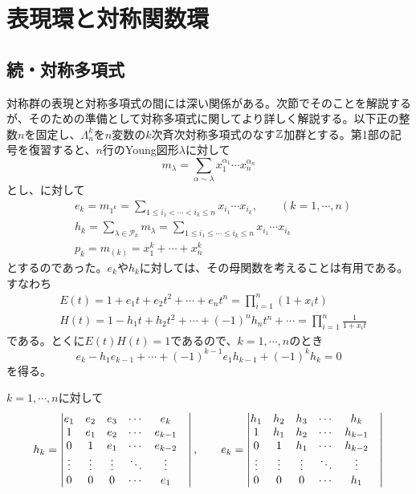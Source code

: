 \documentclass{ltjsreport}
\begin{document}
\section{表現環と対称関数環}

\subsection{続・対称多項式}
対称群の表現と対称多項式の間には深い関係がある。次節でそのことを解説するが、そのための準備として対称多項式に関してより詳しく解説する。以下正の整数$n$を固定し、$\Lambda^k_n$を$n$変数の$k$次斉次対称多項式のなす$\mathbb{Z}$加群とする。第1部の記号を復習すると、$n$行のYoung図形$\lambda$に対して
\[
m_\lambda=\sum_{\alpha\sim\lambda}x_1^{\alpha_1}\cdots x_n^{\alpha_n}  
\]
とし、に対して
\begin{align*}
  &e_k=m_{1^k}=\sum_{1\leq i_1<\cdots<i_k\leq n}x_{i_1}\cdots x_{i_k},\qquad(k=1,\cdots,n)\\
  &h_k=\sum_{\lambda\in\mathcal{P}_k}m_\lambda=\sum_{1\leq i_1\leq\cdots\leq i_k\leq n}x_{i_1}\cdots x_{i_k}\\
  &p_k=m_{(k)}=x_1^k+\cdots+x_n^k
\end{align*}
とするのであった。$e_k$や$h_k$に対しては、その母関数を考えることは有用である。すなわち
\begin{align}
  &E(t)=1+e_1t+e_2t^2+\cdots+e_nt^n=\prod_{i=1}^n(1+x_it) \label{gen_func_of_e}\\
  &H(t)=1-h_1t+h_2t^2+\cdots+(-1)^nh_nt^n+\cdots=\prod_{i=1}^n\frac{1}{1+x_it}
\end{align}
である。とくに$E(t)H(t)=1$であるので、$k=1,\cdots,n$のとき
\begin{equation}\label{e_to_h}
  e_k-h_1e_{k-1}+\cdots+(-1)^{k-1}e_1h_{k-1}+(-1)^kh_k=0   
\end{equation}
を得る。

\begin{prop}\label{det_formula}
  $k=1,\cdots,n$に対して
  \begin{align*}
    h_k=\begin{vmatrix} 
      e_1&e_2&e_3&\cdots&e_k\\
      1&e_1&e_2&\cdots&e_{k-1}\\
      0&1&e_1&\cdots&e_{k-2}\\
      \vdots&\vdots&\vdots&\ddots&\vdots&\\
      0&0&0&\cdots&e_1 \end{vmatrix},\qquad
    e_k=\begin{vmatrix} 
      h_1&h_2&h_3&\cdots&h_k\\
      1&h_1&h_2&\cdots&h_{k-1}\\
      0&1&h_1&\cdots&h_{k-2}\\
      \vdots&\vdots&\vdots&\ddots&\vdots&\\
      0&0&0&\cdots&h_1
     \end{vmatrix}
  \end{align*}
\end{prop}
\end{document}

